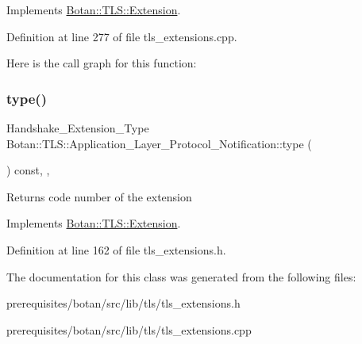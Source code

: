 Implements \mbox{\hyperlink{class_botan_1_1_t_l_s_1_1_extension_a56788726ad2526db54e5a26039cb69db}{Botan\+::\+T\+L\+S\+::\+Extension}}.



Definition at line 277 of file tls\+\_\+extensions.\+cpp.

Here is the call graph for this function\+:
\mbox{\label{class_botan_1_1_t_l_s_1_1_application___layer___protocol___notification_ab60d32531c669dd0d23fdddec69eee17}} 
\subsubsection{\texorpdfstring{type()}{type()}}
{\footnotesize\ttfamily Handshake\+\_\+\+Extension\+\_\+\+Type Botan\+::\+T\+L\+S\+::\+Application\+\_\+\+Layer\+\_\+\+Protocol\+\_\+\+Notification\+::type (\begin{DoxyParamCaption}{ }\end{DoxyParamCaption}) const\hspace{0.3cm}{\ttfamily [inline]}, {\ttfamily [override]}, {\ttfamily [virtual]}}

\begin{DoxyReturn}{Returns}
code number of the extension 
\end{DoxyReturn}


Implements \mbox{\hyperlink{class_botan_1_1_t_l_s_1_1_extension_ac8819b312ce604453225e7b4f7c373ec}{Botan\+::\+T\+L\+S\+::\+Extension}}.



Definition at line 162 of file tls\+\_\+extensions.\+h.



The documentation for this class was generated from the following files\+:\begin{DoxyCompactItemize}
\item 
prerequisites/botan/src/lib/tls/tls\+\_\+extensions.\+h\item 
prerequisites/botan/src/lib/tls/tls\+\_\+extensions.\+cpp\end{DoxyCompactItemize}
